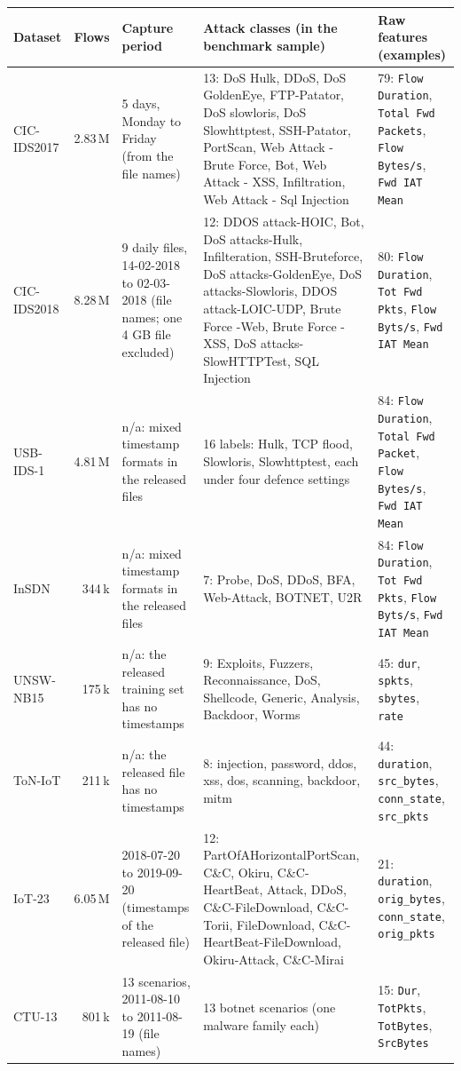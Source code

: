 \begin{tabular}{p{}rp{}p{}p{}}
\toprule
Dataset & Flows & Capture period & Attack classes (in the benchmark sample) & Raw features (examples) \\
\midrule
CIC-IDS2017 & 2.83\,M & 5 days, Monday to Friday (from the file names) & 13: DoS Hulk, DDoS, DoS GoldenEye, FTP-Patator, DoS slowloris, DoS Slowhttptest, SSH-Patator, PortScan, Web Attack - Brute Force, Bot, Web Attack - XSS, Infiltration, Web Attack - Sql Injection & 79: \texttt{Flow Duration}, \texttt{Total Fwd Packets}, \texttt{Flow Bytes/s}, \texttt{Fwd IAT Mean} \\
CIC-IDS2018 & 8.28\,M & 9 daily files, 14-02-2018 to 02-03-2018 (file names; one 4 GB file excluded) & 12: DDOS attack-HOIC, Bot, DoS attacks-Hulk, Infilteration, SSH-Bruteforce, DoS attacks-GoldenEye, DoS attacks-Slowloris, DDOS attack-LOIC-UDP, Brute Force -Web, Brute Force -XSS, DoS attacks-SlowHTTPTest, SQL Injection & 80: \texttt{Flow Duration}, \texttt{Tot Fwd Pkts}, \texttt{Flow Byts/s}, \texttt{Fwd IAT Mean} \\
USB-IDS-1 & 4.81\,M & n/a: mixed timestamp formats in the released files & 16 labels: Hulk, TCP flood, Slowloris, Slowhttptest, each under four defence settings & 84: \texttt{Flow Duration}, \texttt{Total Fwd Packet}, \texttt{Flow Bytes/s}, \texttt{Fwd IAT Mean} \\
InSDN & 344\,k & n/a: mixed timestamp formats in the released files & 7: Probe, DoS, DDoS, BFA, Web-Attack, BOTNET, U2R & 84: \texttt{Flow Duration}, \texttt{Tot Fwd Pkts}, \texttt{Flow Byts/s}, \texttt{Fwd IAT Mean} \\
UNSW-NB15 & 175\,k & n/a: the released training set has no timestamps & 9: Exploits, Fuzzers, Reconnaissance, DoS, Shellcode, Generic, Analysis, Backdoor, Worms & 45: \texttt{dur}, \texttt{spkts}, \texttt{sbytes}, \texttt{rate} \\
ToN-IoT & 211\,k & n/a: the released file has no timestamps & 8: injection, password, ddos, xss, dos, scanning, backdoor, mitm & 44: \texttt{duration}, \texttt{src\_bytes}, \texttt{conn\_state}, \texttt{src\_pkts} \\
IoT-23 & 6.05\,M & 2018-07-20 to 2019-09-20 (timestamps of the released file) & 12: PartOfAHorizontalPortScan, C\&C, Okiru, C\&C-HeartBeat, Attack, DDoS, C\&C-FileDownload, C\&C-Torii, FileDownload, C\&C-HeartBeat-FileDownload, Okiru-Attack, C\&C-Mirai & 21: \texttt{duration}, \texttt{orig\_bytes}, \texttt{conn\_state}, \texttt{orig\_pkts} \\
CTU-13 & 801\,k & 13 scenarios, 2011-08-10 to 2011-08-19 (file names) & 13 botnet scenarios (one malware family each) & 15: \texttt{Dur}, \texttt{TotPkts}, \texttt{TotBytes}, \texttt{SrcBytes} \\
\bottomrule
\end{tabular}

